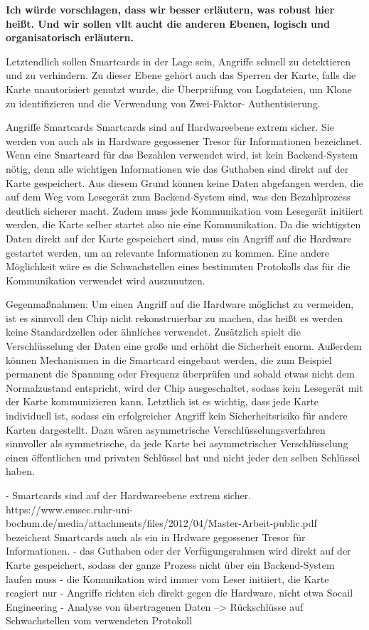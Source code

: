 \textbf{Ich würde vorschlagen, dass wir besser erläutern, was robust hier heißt. Und wir sollen vllt
aucht die anderen Ebenen, logisch und organisatorisch erläutern.}


Letztendlich sollen Smartcards in der Lage sein, Angriffe schnell zu detektieren und zu verhindern.
Zu dieser Ebene gehört auch das Sperren der Karte, falls die Karte unautorisiert genutzt wurde, 
die Überprüfung von Logdateien, um Klone zu identifizieren und die Verwendung von Zwei-Faktor-
Authentisierung.


Angriffe Smartcards
Smartcards sind auf Hardwareebene extrem sicher. Sie werden von \cite{refmas:ASSS} 
auch als in Hardware gegossener Tresor für Informationen bezeichnet. Wenn eine Smartcard für das Bezahlen verwendet wird,
ist kein Backend-System nötig, denn alle wichtigen Informationen wie das Guthaben sind direkt auf der Karte gespeichert. Aus diesem Grund 
können keine Daten abgefangen werden, die auf dem Weg vom Lesegerät zum Backend-System sind, was den Bezahlprozess deutlich sicherer macht.
Zudem muss jede Kommunikation vom Lesegerät initiiert werden, die Karte selber startet also nie eine Kommunikation. Da die wichtigsten Daten
direkt auf der Karte gespeichert sind, muss ein Angriff auf die Hardware gestartet werden, um an relevante Informationen zu kommen.
Eine andere Möglichkeit wäre es die Schwachstellen eines bestimmten Protokolls das für die Kommunikation verwendet wird auszunutzen.

Gegenmaßnahmen:
Um einen Angriff auf die Hardware möglichst zu vermeiden, ist es sinnvoll den Chip nicht rekonstruierbar zu machen,
das heißt es werden keine Standardzellen oder ähnliches verwendet.
Zusätzlich spielt die Verschlüsselung der Daten eine große und erhöht die Sicherheit enorm.
Außerdem können Mechanismen in die Smartcard eingebaut werden, die zum Beispiel permanent die Spannung oder Frequenz
überprüfen und sobald etwas nicht dem Normalzustand entspricht, wird der Chip ausgeschaltet, sodass kein Lesegerät mit der 
Karte kommunizieren kann. Letztlich ist es wichtig, dass jede Karte individuell ist, sodass ein erfolgreicher Angriff kein 
Sicherheitsrisiko für andere Karten dargestellt. Dazu wären asymmetrische Verschlüsselungsverfahren sinnvoller als 
symmetrische, da jede Karte bei asymmetrischer Verschlüsselung einen öffentlichen und privaten Schlüssel hat und nicht jeder den selben 
Schlüssel haben.




- Smartcards sind auf der Hardwareebene extrem sicher. https://www.emsec.ruhr-uni-bochum.de/media/attachments/files/2012/04/Master-Arbeit-public.pdf bezeichent Smartcards auch als 
  ein in Hrdware gegossener Tresor für Informationen. 
- das Guthaben oder der Verfügungsrahmen wird direkt auf der Karte gespeichert, sodass der ganze Prozess nicht über ein Backend-System laufen muss
- die Komunikation wird immer vom Leser initiiert, die Karte reagiert nur
- Angriffe richten sich direkt gegen die Hardware, nicht etwa Socail Engineering 
- Analyse von übertragenen Daten --> Rückschlüsse auf Schwachstellen vom verwendeten Protokoll

